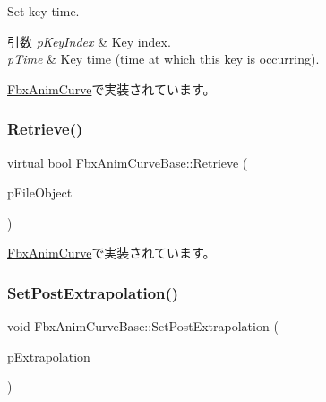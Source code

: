 Set key time. 
\begin{DoxyParams}{引数}
{\em p\+Key\+Index} & Key index. \\
\hline
{\em p\+Time} & Key time (time at which this key is occurring). \\
\hline
\end{DoxyParams}


\hyperlink{class_fbx_anim_curve_a5ce2130d0cea4de2fc42fa3683f01162}{Fbx\+Anim\+Curve}で実装されています。

\mbox{\label{class_fbx_anim_curve_base_a58ba1ce28a08145795d95bb27e2db02f}} 
\subsubsection{\texorpdfstring{Retrieve()}{Retrieve()}}
{\footnotesize\ttfamily virtual bool Fbx\+Anim\+Curve\+Base\+::\+Retrieve (\begin{DoxyParamCaption}\item[{\hyperlink{class_fbx_i_o}{Fbx\+IO} $\ast$}]{p\+File\+Object }\end{DoxyParamCaption})\hspace{0.3cm}{\ttfamily [pure virtual]}}



\hyperlink{class_fbx_anim_curve_a17087752d3a28d373b2aaa66d1755f62}{Fbx\+Anim\+Curve}で実装されています。

\mbox{\label{class_fbx_anim_curve_base_a80e57bd8e710d36348eeb326fd83951b}} 
\subsubsection{\texorpdfstring{Set\+Post\+Extrapolation()}{SetPostExtrapolation()}}
{\footnotesize\ttfamily void Fbx\+Anim\+Curve\+Base\+::\+Set\+Post\+Extrapolation (\begin{DoxyParamCaption}\item[{\hyperlink{class_fbx_anim_curve_base_aa7214d43daa7b6b9b47a8118a858847f}{E\+Extrapolation\+Type}}]{p\+Extrapolation }\end{DoxyParamCaption})}

